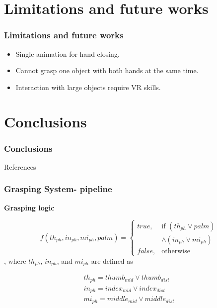 \documentclass{beamer}
\theoremstyle{remark}
\theoremstyle{plain}
\begin{document}
\section{Limitations and future works}

\begin{frame}
	\frametitle{Limitations and future works}
	
	\begin{itemize}
		\item Single animation for hand closing.
		\item Cannot grasp one object with both hands at the same time.
		\item Interaction with large objects require VR skills.
	\end{itemize}
\end{frame}

\section{Conclusions}

\begin{frame}
	\frametitle{Conclusions}
	
\end{frame}


\begin{frame}
	\titlepage
\end{frame}


\setcounter{lastframe}{\insertframenumber}

\begin{frame}[allowframebreaks]{References}


\end{frame}

\setcounter{framenumber}{\thelastframe}

\begin{frame}
	\frametitle{Grasping System- pipeline}
	
	\textbf{Grasping logic}
	
	\begin{equation} \label{eq:3}
	f(th_{ph}, in_{ph}, mi_{ph}, palm)= 
	\begin{cases}
	true, & \text{if } (th_{ph} \lor palm) \\
	& \land (in_{ph} \lor mi_{ph})\\
	false,              & \text{otherwise}
	\end{cases}
	\end{equation}, where $th_{ph}$, $in_{ph}$, and $mi_{ph}$ are defined as
	
	\begin{equation} \label{eq:4}
	\begin{array}{l}
	th_{ph} = thumb_{mid} \lor thumb_{dist} \\
	in_{ph} = index_{mid} \lor index_{dist} \\
	mi_{ph} = middle_{mid} \lor middle_{dist} \\
	\end{array}
	\end{equation}
	
\end{frame}
\end{document}
